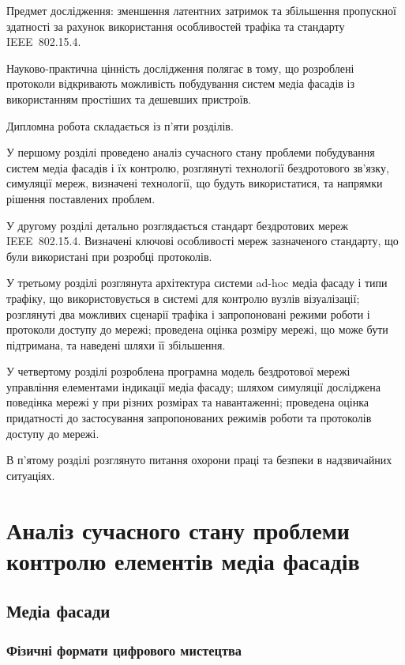 \documentclass[a4paper,ukrainian,utf8,nocolumnsxix,floatsection,equationsection]{eskdtext}
\renewcommand\paragraph{\subsubsection}
\newcommand{\iee}[0]{IEEE~802.15.4\xspace}
\begin{document}
Предмет дослідження: зменшення латентних затримок та збільшення пропускної здатності за рахунок використання особливостей трафіка та стандарту \iee.

Науково-практична цінність дослідження полягає в тому, що розроблені протоколи відкривають можливість побудування систем медіа фасадів із використанням простіших та дешевших пристроїв.

Дипломна робота складається із п’яти розділів.

У першому розділі проведено аналіз сучасного стану проблеми побудування систем медіа фасадів і їх контролю, розглянуті технології бездротового зв’язку, симуляції мереж, визначені технології, що будуть використатися, та напрямки рішення поставлених проблем.

У другому розділі детально розглядається стандарт бездротових мереж \iee. Визначені ключові особливості мереж зазначеного стандарту, що були використані при розробці протоколів.

У третьому розділі розглянута архітектура системи ad-hoc медіа фасаду і типи трафіку, що використовується в системі для контролю вузлів візуалізації; розглянуті два можливих сценарії трафіка і запропоновані режими роботи і протоколи доступу до мережі; проведена оцінка розміру мережі, що може бути підтримана, та наведені шляхи її збільшення.

У четвертому розділі розроблена програмна модель бездротової мережі управління елементами індикації медіа фасаду; шляхом симуляції досліджена поведінка мережі у при різних розмірах та навантаженні; проведена оцінка придатності до застосування запропонованих режимів роботи та протоколів доступу до мережі.

В п’ятому розділі розглянуто питання охорони праці та безпеки в надзвичайних ситуаціях.

\section{Аналіз сучасного стану проблеми контролю елементів медіа фасадів} %
\label{sec:1}

\subsection{Медіа фасади}


\paragraph{Фізичні формати цифрового мистецтва} %
\label{par:digital_art_physical_formats}
\end{document}
